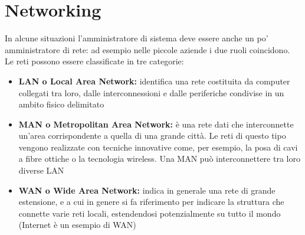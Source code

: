 \documentclass[a4paper]{report}
\begin{document}
\chapter{Networking}
In alcune situazioni l'amministratore di sistema deve essere anche un po’
amministratore di rete: ad esempio nelle piccole aziende i due ruoli
coincidono.\\
Le reti possono essere classificate in tre categorie:
\begin{itemize}
\item \textbf{LAN o Local Area Network:} identifica una rete costituita da computer
collegati tra loro, dalle interconnessioni e dalle periferiche condivise in un
ambito fisico delimitato
\item \textbf{MAN o Metropolitan Area Network:} è una rete dati che interconnette
un'area corrispondente a quella di una grande città. Le reti di questo tipo
vengono realizzate con tecniche innovative come, per esempio, la posa di cavi
a fibre ottiche o la tecnologia wireless. Una MAN può interconnettere tra loro
diverse LAN
\item \textbf{WAN o Wide Area Network:} indica in generale una rete di grande
estensione, e a cui in genere si fa riferimento per indicare la struttura che
connette varie reti locali, estendendosi potenzialmente su tutto il mondo
(Internet è un esempio di WAN)
\end{itemize}
\end{document}
